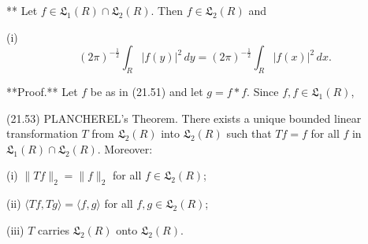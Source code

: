 ** Let $f \in \mathfrak{L}_1(R) \cap \mathfrak{L}_2(R)$. Then $f \in \mathfrak{L}_2(R)$ and

(i) $$\left(2\pi\right)^{-\frac{1}{2}} \int_{R} |f(y)|^2 \, dy = \left(2\pi\right)^{-\frac{1}{2}} \int_{R} |f(x)|^2 \, dx.$$

**Proof.** Let $f$ be as in (21.51) and let $g = f * f$. Since $f, f \in \mathfrak{L}_1(R)$,

(21.53) PLANCHEREL's Theorem. There exists a unique bounded linear transformation $T$ from $\mathfrak{L}_2(R)$ into $\mathfrak{L}_2(R)$ such that $Tf = f$ for all $f$ in $\mathfrak{L}_1(R) \cap \mathfrak{L}_2(R)$. Moreover:

(i) $\| Tf \|_2 = \| f \|_2$ for all $f \in \mathfrak{L}_2(R)$;

(ii) $\langle Tf, Tg \rangle = \langle f, g \rangle$ for all $f, g \in \mathfrak{L}_2(R)$;

(iii) $T$ carries $\mathfrak{L}_2(R)$ onto $\mathfrak{L}_2(R)$.